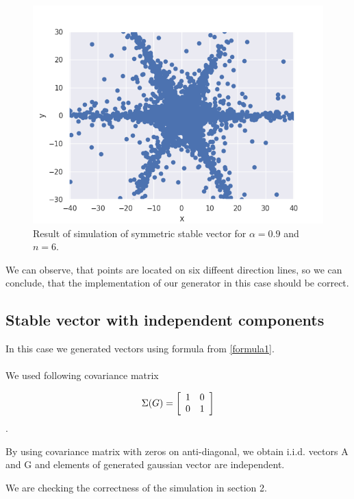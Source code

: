 \documentclass{article}
\begin{document}
	\begin{figure}[H]
		\centering
		\includegraphics[width=1\linewidth]{images/ex_1_a_alpha_stable_vector_simulation_symmetric_discreet_scatter.png}
		\caption{Result of simulation of symmetric stable vector for $\alpha=0.9$ and $n=6$.}\label{1}
	\end{figure}

	We can observe, that points are located on six diffeent direction lines, so we can conclude, that the implementation of our generator in this case should be correct.
	
	\subsection{Stable vector with independent components}
	
	In this case we generated vectors using formula from \ref{formula1}. 
	\\ \\
	We used following covariance matrix 
	
	\[\Sigma(G) = \left[{\begin{array}{*{20}c}
			1 & 0\\
			0 & 1\end{array} } \right]\]. 
	
	By using covariance matrix with zeros on anti-diagonal, we obtain i.i.d. vectors A and G and elements of generated gaussian vector are independent.
	
	We are checking the correctness of the simulation in section 2.
	
\end{document}

